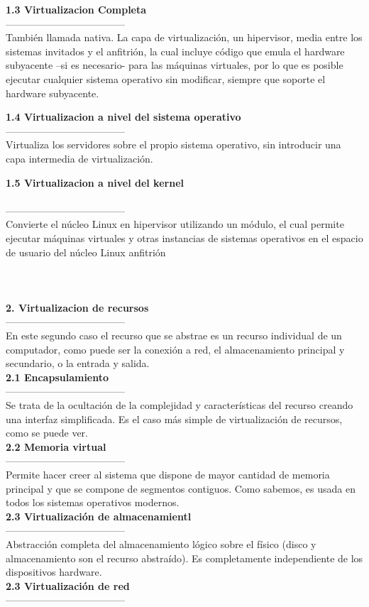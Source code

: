 \documentclass[twoside,twocolumn]{article}
\begin{document}
\begin{flushright}
\begin{itemize}
\textbf{1.3  Virtualizacion Completa }\\
------------------------------------
\textbf{}\\ 
También llamada nativa. La capa de virtualización, un
hipervisor, media entre los sistemas invitados y el anfitrión, la cual incluye
código que emula el hardware subyacente –si es necesario- para las máquinas
virtuales, por lo que es posible ejecutar cualquier sistema operativo sin
modificar, siempre que soporte el hardware subyacente.

\textbf{1.4  Virtualizacion a nivel del sistema operativo }\\
------------------------------------
\textbf{}\\
Virtualiza los servidores sobre el
propio sistema operativo, sin introducir una capa intermedia de virtualización.

\textbf{1.5 Virtualizacion a nivel del kernel }\\
\textbf{}\\
------------------------------------
\textbf{}\\
Convierte el núcleo Linux en hipervisor
utilizando un módulo, el cual permite ejecutar máquinas virtuales y otras
instancias de sistemas operativos en el espacio de usuario del núcleo Linux
anfitrión
\textbf{}\\
\textbf{}\\
\textbf{}\\
\textbf{}\\
 \textbf{2. Virtualizacion de recursos }\\
------------------------------------
\textbf{}\\
En este segundo caso el recurso que se abstrae es un recurso
individual de un computador, como puede ser la conexión a red, el almacenamiento
principal y secundario, o la entrada y salida.
\textbf{}\\
 \textbf{2.1  Encapsulamiento }\\
------------------------------------
\textbf{}\\
Se trata de la ocultación de la complejidad y características del
recurso creando una interfaz simplificada. Es el caso más simple de
virtualización de recursos, como se puede ver.
\textbf{}\\
 \textbf{2.2  Memoria virtual }\\
------------------------------------
\textbf{}\\
Permite hacer creer al sistema que dispone de mayor cantidad
de memoria principal y que se compone de segmentos contiguos. Como
sabemos, es usada en todos los sistemas operativos modernos. 
\textbf{}\\
\textbf{2.3  Virtualización de almacenamientl }\\
------------------------------------
\textbf{}\\
Abstracción completa del almacenamiento
lógico sobre el físico (disco y almacenamiento son el recurso abstraído). Es
completamente independiente de los dispositivos hardware.
\textbf{}\\
\textbf{2.3 Virtualización de red }\\
------------------------------------


\end{itemize}
\end{flushright}
\end{document}
